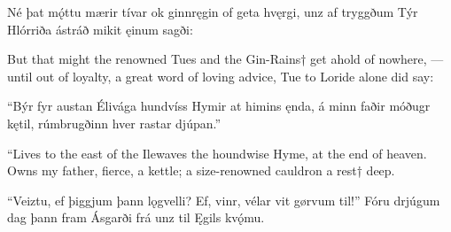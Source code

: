 Né þat mǫ́ttu \hld mærir tívar
ok ginnręgin \hld of geta hvęrgi,
unz af tryggðum \hld Týr Hlórriða
ástráð mikit \hld ęinum sagði:

But that might the renowned Tues and the Gin-Rains† get ahold of nowhere, — until out of loyalty, a great word of loving advice, Tue to Loride alone did say:

“Býr fyr austan \hld Élivága
hundvíss Hymir \hld at himins ęnda,
á minn faðir \hld móðugr kętil,
rúmbrugðinn hver \hld rastar djúpan.”

“Lives to the east of the Ilewaves the houndwise Hyme, at the end of heaven. Owns my father\footnotemark[1], fierce, a kettle; a size-renowned cauldron a rest† deep.

“Veiztu, ef þiggjum \hld þann lǫgvelli?
Ef, vinr, vélar \hld vit gørvum til!”
Fóru drjúgum \hld dag þann fram
Ásgarði frá \hld unz til Ęgils kvǫ́mu. 
